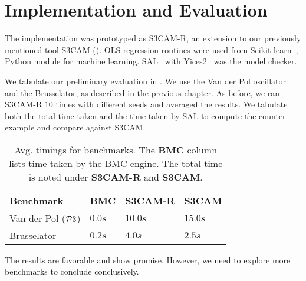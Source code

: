 
\section{Implementation and Evaluation}

The implementation was prototyped as S3CAM-R, an extension to our
previously mentioned tool S3CAM (). OLS regression
routines were used from Scikit-learn~\cite{pedregosa2011scikit},
Python module for machine learning. SAL~\cite{SAL-SRI}
with Yices2~\cite{dutertre2014yices} was the model checker.

We tabulate our preliminary evaluation in . We use the
Van der Pol oscillator and the Brusselator, as described in the previous
chapter. As before, we ran S3CAM-R $10$ times with different seeds and
averaged the results. We tabulate both the total time taken and the
time taken by SAL to compute the counter-example and compare against
S3CAM.

\begin{table*}[!htbp]
\centering
\caption{Avg. timings for benchmarks. The \textbf{BMC} column lists time
    taken by the BMC engine. The total time is noted under
\textbf{S3CAM-R} and \textbf{S3CAM}.}
\label{tab:res-rel}
\begin{tabular}{@{}llll@{}}
\toprule
Benchmark & BMC & S3CAM-R & S3CAM\\
\midrule
Van der Pol ($\mathcal{P}3$)    & $0.0s$  & $10.0s$ & $15.0s$\\
Brusselator               & $0.2s$ & $4.0s$  & $2.5s$\\
\bottomrule
\end{tabular}
\end{table*}


The results are favorable and show promise. However, we need to
explore more benchmarks to conclude conclusively.
